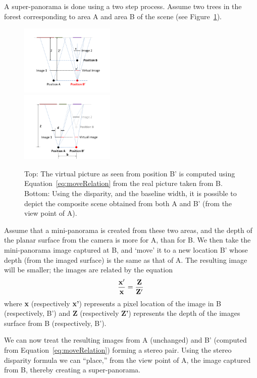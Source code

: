 \documentclass[10pt,twocolumn,letterpaper]{article}
\begin{document}
A super-panorama is done using a two step process. Assume two trees in
the forest corresponding to area A and area B of the scene (see
Figure~\ref{fig:stereo}). 
\begin{figure}[h!]
  \centering
  \includegraphics[width=0.4\textwidth]{figures/move} \\
  \includegraphics[width=0.4\textwidth]{figures/stereo} 
  \caption{ \label{fig:stereo} Top: The virtual picture as seen from position B'
    is computed using Equation~\ref{eq:moveRelation} from the real picture
    taken from B.  Bottom: Using the disparity, and the baseline width,
  it is possible to depict the composite scene obtained from both A
  and B' (from the view point of A).}
\end{figure}    
Assume that a mini-panorama is created from these two areas, and the
depth of the planar surface from the camera is more for A, than for
B. We then take the mini-panorama image captured at B, and `move' it to
a new location B’ whose depth (from the imaged surface) is the same as
that of A. The resulting image  will be smaller; the images are
related by the equation
\begin{equation}
  \label{eq:moveRelation}
  {\bf \frac{x'}{x} = \frac{Z}{Z'}}
\end{equation}
where {\bf x} (respectively {\bf x'}) represents a pixel location of
the image in B (respectively, B') and 
{\bf Z} (respectively {\bf Z'}) represents the depth of the images
surface from B (respectively, B').

We can now treat the resulting images from A (unchanged) and B’
(computed from Equation~\ref{eq:moveRelation}) forming a stereo pair.
Using the stereo disparity formula we can ``place,'' from the view
point of A, the image captured from B, thereby creating a
super-panorama.
\end{document}
